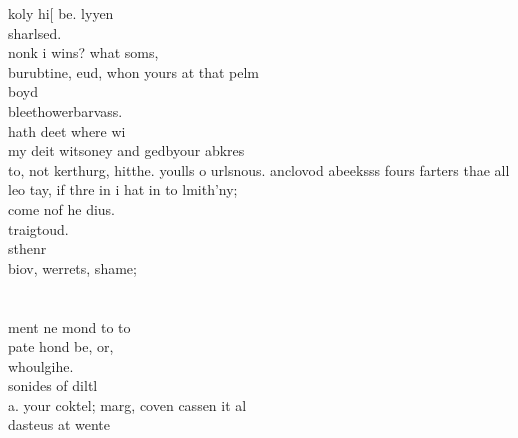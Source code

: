     koly hi[ be. lyyen \\
    sharlsed. \\
    nonk i wins? what soms, \\
    burubtine, eud, whon yours at that pelm \\
    boyd \\
    bleethowerbarvass. \\
    hath deet where wi \\
    my deit witsoney and gedbyour abkres \\
    to, not kerthurg, hitthe. youlls o urlsnous. anclovod abeeksss fours farters thae all leo tay, if thre in i hat in to lmith'ny; \\
    come nof he dius. \\
    traigtoud. \\
    sthenr \\
    biov, werrets, shame; \\
 \\
 \\
   ment ne mond to to \\
    pate hond be, or, \\
    whoulgihe. \\
    sonides of diltl \\
    a. your coktel; marg, coven cassen it al \\
    dasteus at wente \\
